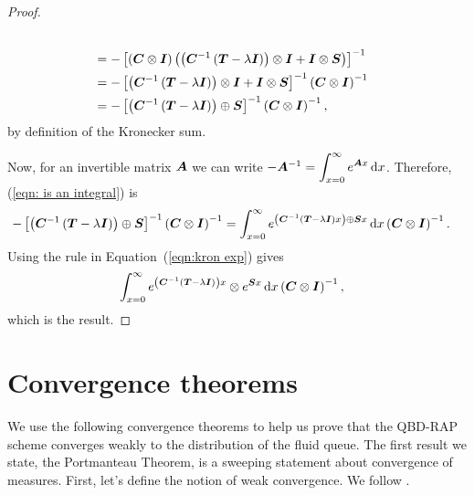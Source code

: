 \begin{proof}
\begin{align}
		\\&= - \left[\left(\boldsymbol{C}\otimes \boldsymbol{I}\right)\left(\left(\boldsymbol{C}^{-1}\left(\boldsymbol{T}-\lambda \boldsymbol{I}\right)\right)\otimes \boldsymbol{I} + \boldsymbol{I}\otimes \boldsymbol{S}\right)\right]^{-1} \nonumber
		\\&= - \left[\left(\boldsymbol{C}^{-1}\left(\boldsymbol{T}-\lambda \boldsymbol{I}\right)\right)\otimes \boldsymbol{I} + \boldsymbol{I}\otimes \boldsymbol{S}\right]^{-1}\left(\boldsymbol{C}\otimes \boldsymbol{I}\right)^{-1} \nonumber
		\\&= - \left[\left(\boldsymbol{C}^{-1}\left(\boldsymbol{T}-\lambda \boldsymbol{I}\right)\right)\oplus \boldsymbol{S}\right]^{-1}\left(\boldsymbol{C}\otimes \boldsymbol{I}\right)^{-1},\label{eqn: is an integral}
	\end{align}
	by definition of the Kronecker sum.
	
	Now, for an invertible matrix \(\boldsymbol A\) we can write \(-\boldsymbol A^{-1} = \displaystyle\int_{x=0}^\infty e^{\boldsymbol Ax}\, \mathrm{d} x\). Therefore, (\ref{eqn: is an integral}) is 
	\begin{align*}
		-\left[\left(\boldsymbol{C}^{-1}\left(\boldsymbol{T}-\lambda \boldsymbol{I}\right)\right)\oplus \boldsymbol{S}\right]^{-1}\left(\boldsymbol{C}\otimes \boldsymbol{I}\right)^{-1}
		&= \int_{x=0}^\infty e^{\left(\boldsymbol{C}^{-1}\left(\boldsymbol{T}-\lambda \boldsymbol{I}\right)x\right)\oplus \boldsymbol{S}x}\, \mathrm{d} x\left(\boldsymbol{C}\otimes \boldsymbol{I}\right)^{-1}.
	\end{align*}
	{Using the rule in Equation~(\ref{eqn:kron exp}) gives }
	\begin{align*}
		&\int_{x=0}^\infty e^{\left(\boldsymbol{C}^{-1}\left(\boldsymbol{T}-\lambda \boldsymbol{I}\right)\right)x}\otimes e^{ \boldsymbol{S}x}\, \mathrm{d} x\left(\boldsymbol{C}\otimes \boldsymbol{I}\right)^{-1},
	\end{align*}
	which is the result.
\end{proof}



\section{Convergence theorems}
We use the following convergence theorems to help us prove that the QBD-RAP scheme converges weakly to the distribution of the fluid queue. The first result we state, the Portmanteau Theorem, is a sweeping statement about convergence of measures. First, let's define the notion of weak convergence. We follow \cite{billingsleyconvergence}.

